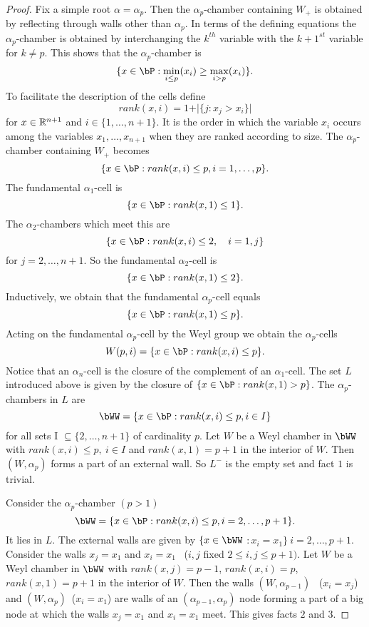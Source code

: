 \documentclass{memo-l}
\theoremstyle{definition}
\theoremstyle{remark}
\numberwithin{section}{chapter}
\numberwithin{equation}{chapter}
\begin{document}
\begin{proof}
   Fix a simple root ${\alpha} = {\alpha}_{p}$.  Then the
${\alpha}_{p}$-chamber containing $W_{+}$ is obtained by reflecting through
walls other than ${\alpha}_{p}$.  In terms of the defining equations the
${\alpha}_{p}$-chamber is obtained by interchanging the $k^{th}$ variable
with the $k+1^{st}$ variable for $k \ne p$.  This shows that the
${\alpha}_{p}$-chamber is
$$
\{x  \in  \bP: \min_{i \le  p} (x_{i}) \ge \max_{i > p} (x_{i})\}.
$$
To facilitate the description of the cells define
$$
rank(x,i) = 1 + \vert \{j: x_{j} > x_{i}\}\vert
$$
for $x  \in  {\Bbb R^{n+1}}$ and $i  \in  \{1,\ldots ,n+1\}$.  It is
the order in which the variable $x_{i}$ occurs among the variables
$x_{1},\ldots ,x_{n+1}$ when they are ranked according to size.  The
${\alpha}_{p}$-chamber containing $W_{+}$ becomes
$$
\{x  \in  \bP: rank(x,i) \le p, i = 1,\ldots ,p\}.
$$
The fundamental ${\alpha}_{1}$-cell is
$$
\{x  \in  \bP: rank(x,1) \le 1\}.
$$
The ${\alpha}_{2}$-chambers which meet this are
$$
\{x  \in  \bP: rank(x,i) \le 2,\quad i = 1,j\}
$$
for $j = 2,\ldots ,n+1$.  So the fundamental ${\alpha}_{2}$-cell is
$$
\{x  \in  \bP: rank(x,1) \le 2\}.
$$
Inductively, we obtain that the fundamental ${\alpha}_{p}$-cell equals
$$
\{x  \in  \bP: rank(x,1) \le p\}.
$$
Acting on the fundamental ${\alpha}_{p}$-cell by the Weyl group we obtain
the ${\alpha}_{p}$-cells
$$
W(p,i) = \{x  \in  \bP: rank(x,i) \le p\}.
$$
Notice that an ${\alpha}_{n}$-cell is the closure of the complement of an
${\alpha}_{1}$-cell.  The set $L$ introduced above is given by the closure
of $\{x  \in  \bP: rank(x,1)>p\}$.  The ${\alpha}_{p}$-chambers in $L$
are
$$
\bWW = \{x  \in  \bP: rank(x,i) \le p, i  \in  I\}
$$
for all sets I ${\subseteq} \{2,\ldots ,n+1\}$ of cardinality $p$.  Let $W$
be a Weyl chamber in $\bWW$ with $rank(x,i) \le p,\
i  \in  I$ and
$rank(x,1) = p+1$ in the interior of $W$.  Then $(W,{\alpha}_{p})$ forms a
part of an external wall.  So $L^{-}$ is the empty set and fact $1$ is
trivial.

   Consider the ${\alpha}_{p}$-chamber $(p > 1)$
$$
\bWW = \{x  \in  \bP: rank(x,i) \le p, i = 2,\ldots ,p+1\}.
$$
It lies in $L$.  The external walls are given by $\{x  \in \bWW$
$:x_{i} = x_{1}\}\  i = 2,\ldots ,p+1$.  Consider the walls $x_{j} = x_{1}$ and
$x_{i} = x_{1}$ \ ($i,j$ fixed $2 \le i,j \le p+1)$.  Let $W$ be a Weyl
chamber in $\bWW$ with $rank(x,j) = p-1$, $rank(x,i) = p$,
$rank(x,1) = p+1$ in the
interior of $W$.  Then the walls $(W,{\alpha}_{p-1})$ \ ($x_{i}  = x_{j}$) and
$(W,{\alpha}_{p})$\  ($x_{i} = x_{1}$) are walls of an
$({\alpha}_{p-1},{\alpha}_{p})$ node forming a part of a big node at which
the walls $x_{j} = x_{1}$ and $x_{i} = x_{1}$ meet.  This gives facts $2$ and
$3$.


\end{proof}
\end{document}
